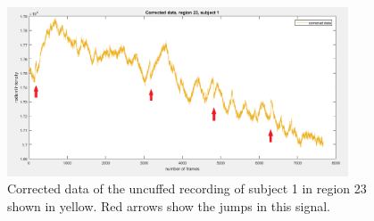 \begin{figure}[H]
	\includegraphics[width=0.9\textwidth]{figures/corr23pfeile}
	\caption{Corrected data of the uncuffed recording of subject 1 in region 23 shown in yellow. Red arrows show the jumps in this signal.}
	\label{fig:corr23}
\end{figure}